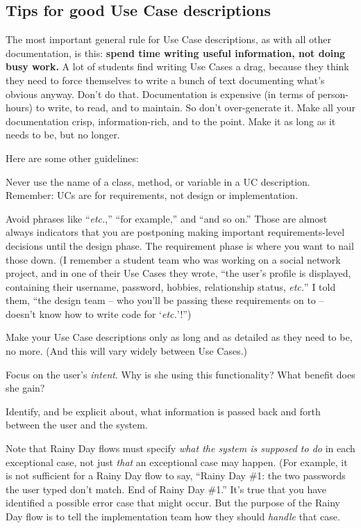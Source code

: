 \subsection{Tips for good Use Case descriptions}

The most important general rule for Use Case descriptions, as with all other
documentation, is this: \textbf{spend time writing useful information, not
doing busy work.} A lot of students find writing Use Cases a drag, because
they think they need to force themselves to write a bunch of text documenting
what's obvious anyway. Don't do that. Documentation is expensive (in terms of
person-hours) to write, to read, and to maintain. So don't over-generate it.
Make all your documentation crisp, information-rich, and to the point. Make it
as long as it needs to be, but no longer.

Here are some other guidelines:

\begin{compactitem}
\item Never use the name of a class, method, or variable in a UC description.
Remember: UCs are for requirements, not design or implementation.
\item Avoid phrases like ``\textit{etc.},'' ``for example,'' and ``and so
on.'' Those are almost always indicators that you are postponing making
important requirements-level decisions until the design phase. The requirement
phase is where you want to nail those down. (I remember a student team who was
working on a social network project, and in one of their Use Cases they wrote,
``the user's profile is displayed, containing their username, password,
hobbies, relationship status, \textit{etc.}'' I told them, ``the design team
-- who you'll be passing these requirements on to -- doesn't know how to write
code for `\textit{etc.}'!'')
\item Make your Use Case descriptions only as long and as detailed as they
need to be, no more. (And this will vary widely between Use Cases.)
\item Focus on the user's \textit{intent}. Why is she using this
functionality? What benefit does she gain?
\item Identify, and be explicit about, what information is passed back and
forth between the user and the system.
\item Note that Rainy Day flows must specify \textit{what the system is
supposed to do} in each exceptional case, not just \textit{that} an
exceptional case may happen. (For example, it is not sufficient for a Rainy
Day flow to say, ``Rainy Day \#1: the two passwords the user typed don't
match. End of Rainy Day \#1.'' It's true that you have identified a possible
error case that might occur. But the purpose of the Rainy Day flow is to tell
the implementation team how they should \textit{handle} that case.
\end{compactitem}

